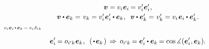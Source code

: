 \nopagebreak\vspace{-0.8em}\begin{equation*}
\begin{array}{c}
\bm{v} = v_{i} \hspace{.1ex} \bm{e}_{i} \hspace{-0.16ex} = v'_{i} \hspace{.1ex} \bm{e}'_{i} \hspace{.1ex}, \\[.2em]
%
\bm{v} \dotp \bm{e}_k = \hspace{-0.2ex} \tikzmark{beginComponentOfVector} \,v_k\, \tikzmark{endComponentOfVector} \hspace{-0.4ex} = v'_{i} \hspace{.2ex} \bm{e}'_{i} \dotp \bm{e}_k \hspace{.1ex}, \;\;
\bm{v} \dotp \bm{e}'_{k} = \hspace{.12ex} v'_{k} = v_i \hspace{.2ex} \bm{e}_i \dotp \bm{e}'_{k} \hspace{.1ex}.
\end{array}
\vspace{.5em}\end{equation*}
%
{${\scriptstyle v_i \bm{e}_i \hspace{0.2ex}\dotp\hspace{0.32ex} \bm{e}_k \hspace{.2ex}=\hspace{.4ex} v_i \hspace{.1ex} \delta_{ik}}$}



\nopagebreak\vspace{-0.25em}\begin{equation}
\bm{e}'_{i} \hspace{-0.16ex} = \cosinematrix{i'k} \hspace{.1ex} \bm{e}_k \hspace{0.1ex}, \;\:
(\hspace{0.32ex} \dotp \hspace{.25ex} \bm{e}_k \hspace{0.25ex}) \,\Rightarrow\: \cosinematrix{i'k} \hspace{-0.16ex} = \bm{e}'_{i} \dotp \bm{e}_k \hspace{-0.16ex} = \operatorname{cos} \measuredangle (\bm{e}'_{i} \hspace{.1ex}, \bm{e}_k).
\end{equation}

